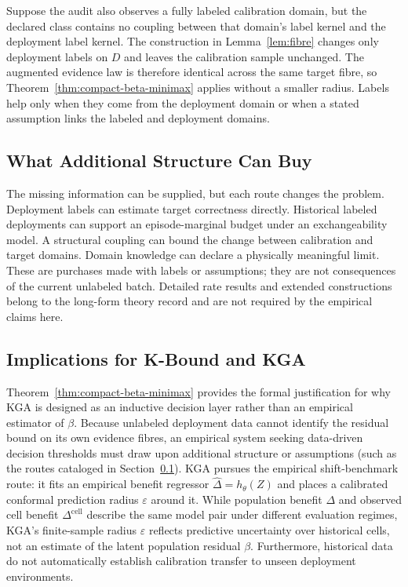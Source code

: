 Suppose the audit also observes a fully labeled calibration domain, but the declared class contains
no coupling between that domain's label kernel and the deployment label kernel. The construction in
Lemma~\ref{lem:fibre} changes only deployment labels on $D$ and leaves the calibration sample
unchanged. The augmented evidence law is therefore identical across the same target fibre, so
Theorem~\ref{thm:compact-beta-minimax} applies without a smaller radius. Labels help only when they
come from the deployment domain or when a stated assumption links the labeled and deployment
domains.

\subsection{What Additional Structure Can Buy}
\label{sec:compact-additional-structure}

The missing information can be supplied, but each route changes the problem. Deployment labels can
estimate target correctness directly. Historical labeled deployments can support an
episode-marginal budget under an exchangeability model. A structural coupling can bound the change
between calibration and target domains. Domain knowledge can declare a physically meaningful
limit. These are purchases made with labels or assumptions; they are not consequences of the
current unlabeled batch. Detailed rate results and extended constructions belong to the long-form
theory record and are not required by the empirical claims here.

\subsection{Implications for K-Bound and KGA}

Theorem~\ref{thm:compact-beta-minimax} provides the formal justification for why KGA is designed
as an inductive decision layer rather than an empirical estimator of $\beta$. Because unlabeled
deployment data cannot identify the residual bound on its own evidence fibres, an empirical system
seeking data-driven decision thresholds must draw upon additional structure or assumptions (such
as the routes cataloged in Section~\ref{sec:compact-additional-structure}). KGA pursues the
empirical shift-benchmark route:
it fits an empirical benefit regressor $\widehat\Delta=h_\theta(Z)$ and places a calibrated
conformal prediction radius $\varepsilon$ around it. While population benefit $\Delta$ and observed
cell benefit $\Delta^{\mathrm{cell}}$ describe the same model pair under different evaluation
regimes, KGA's finite-sample radius $\varepsilon$ reflects predictive uncertainty over historical
cells, not an estimate of the latent population residual $\beta$. Furthermore, historical data do
not automatically establish calibration transfer to unseen deployment environments.

